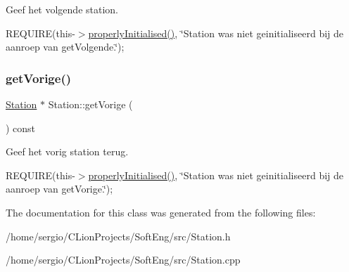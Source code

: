 Geef het volgende station. 

R\+E\+Q\+U\+I\+RE(this-\/$>$\hyperlink{class_station_a9ce626dd0599e3ea8107404a59c21e16}{properly\+Initialised()}, \char`\"{}\+Station was niet geinitialiseerd bij de aanroep van get\+Volgende.\char`\"{});~\newline
\mbox{\label{class_station_a69c0539e899ff540c38eb434a69bfa9e}} 
\subsubsection{\texorpdfstring{get\+Vorige()}{getVorige()}}
{\footnotesize\ttfamily \hyperlink{class_station}{Station} $\ast$ Station\+::get\+Vorige (\begin{DoxyParamCaption}{ }\end{DoxyParamCaption}) const}



Geef het vorig station terug. 

R\+E\+Q\+U\+I\+RE(this-\/$>$\hyperlink{class_station_a9ce626dd0599e3ea8107404a59c21e16}{properly\+Initialised()}, \char`\"{}\+Station was niet geinitialiseerd bij de aanroep van get\+Vorige.\char`\"{});~\newline


The documentation for this class was generated from the following files\+:\begin{DoxyCompactItemize}
\item 
/home/sergio/\+C\+Lion\+Projects/\+Soft\+Eng/src/Station.\+h\item 
/home/sergio/\+C\+Lion\+Projects/\+Soft\+Eng/src/Station.\+cpp\end{DoxyCompactItemize}
